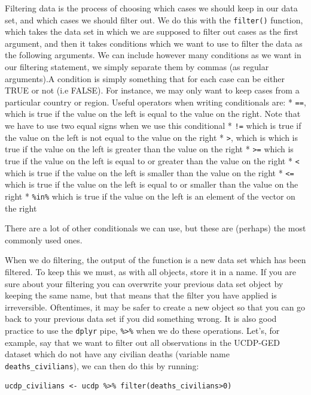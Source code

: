 \documentclass[
]{book}
\begin{document}
Filtering data is the process of choosing which cases we should keep in our data set, and which cases we should filter out. We do this with the \texttt{filter()} function, which takes the data set in which we are supposed to filter out cases as the first argument, and then it takes conditions which we want to use to filter the data as the following arguments. We can include however many conditions as we want in our filtering statement, we simply separate them by commas (as regular arguments).A condition is simply something that for each case can be either TRUE or not (i.e FALSE). For instance, we may only want to keep cases from a particular country or region. Useful operators when writing conditionals are:
* \texttt{==}, which is true if the value on the left is equal to the value on the right. Note that we have to use two equal signs when we use this conditional
* \texttt{!=} which is true if the value on the left is not equal to the value on the right
* \texttt{\textgreater{}}, which is which is true if the value on the left is greater than the value on the right
* \texttt{\textgreater{}=} which is true if the value on the left is equal to or greater than the value on the right
* \texttt{\textless{}} which is true if the value on the left is smaller than the value on the right
* \texttt{\textless{}=} which is true if the value on the left is equal to or smaller than the value on the right
* \texttt{\%in\%} which is true if the value on the left is an element of the vector on the right

There are a lot of other conditionals we can use, but these are (perhaps) the most commonly used ones.

When we do filtering, the output of the function is a new data set which has been filtered. To keep this we must, as with all objects, store it in a name. If you are sure about your filtering you can overwrite your previous data set object by keeping the same name, but that means that the filter you have applied is irreversible. Oftentimes, it may be safer to create a new object so that you can go back to your previous data set if you did something wrong. It is also good practice to use the \texttt{dplyr} pipe, \texttt{\%\textgreater{}\%} when we do these operations. Let's, for example, say that we want to filter out all observations in the UCDP-GED dataset which do not have any civilian deaths (variable name \texttt{deaths\_civilians}), we can then do this by running:

\begin{verbatim}
ucdp_civilians <- ucdp %>% filter(deaths_civilians>0)
\end{verbatim}
\end{document}
